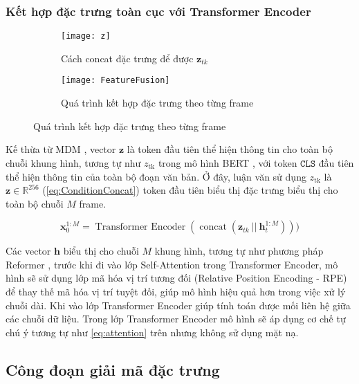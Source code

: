\subsubsection{Kết hợp đặc trưng toàn cục với Transformer Encoder}

\begin{figure}[H]
	\centering
	\begin{subfigure}{0.42\textwidth}
		\centering
		\texttt{[image: z]}
		\caption{Cách concat đặc trưng để được $\mathbf{z}_{tk}$}
		\label{fig:FeatureFusion}
	\end{subfigure}
	\hfill
	\begin{subfigure}{0.55\textwidth}
		\centering
		\texttt{[image: FeatureFusion]}
		\caption{Quá trình kết hợp đặc trưng theo từng frame}
		\label{fig:ZToken}
	\end{subfigure}
\end{figure}


Kế thừa từ MDM \cite{tevet2022human}, vector $\mathbf{z}$ là token đầu tiên thể hiện thông tin cho toàn bộ chuỗi khung hình, tương tự như  $z_{\text{tk}}$ trong mô hình BERT \cite{devlin2019bertpretrainingdeepbidirectional}, với token $\texttt{CLS}$ đầu tiên thể hiện thông tin của toàn bộ đoạn văn bản.
Ở đây, luận văn sử dụng $z_{\text{tk}}$ là $\mathbf{z} \in \mathbb{R}^{256}$ (\autoref{eq:ConditionConcat}) token đầu tiên biểu thị đặc trưng biểu thị cho toàn bộ chuỗi $M$ frame.

\begin{equation}
	\mathbf{x}^{1:M}_{0}  = \operatorname{Transformer\ Encoder}( \operatorname{concat}( \mathbf{z}_{tk} \ ||\  \mathbf{h}^{1:M}_{t}  )))
	\label{eq:TransformerEncoder}
\end{equation}


Các vector $\mathbf{h}$ biểu thị cho chuỗi $M$ khung hình, tương tự như phương pháp Reformer \cite{kitaev2020reformer}, trước khi đi vào lớp Self-Attention trong Transformer Encoder, mô hình sẽ sử dụng lớp mã hóa vị trí tương đối (Relative Position Encoding - RPE) để thay thế mã hóa vị trí tuyệt đối, giúp mô hình hiệu quả hơn trong việc xử lý chuỗi dài.
Khi vào lớp Transformer Encoder \cite{vaswani2017attention} giúp tính toán được mối liên hệ giữa các chuỗi dữ liệu. 
Trong lớp Transformer Encoder mô hình sẽ áp dụng cơ chế tự chú ý tương tự như \autoref{eq:attention} trên nhưng không sử dụng mặt nạ. 


\subsection{Công đoạn giải mã đặc trưng}

